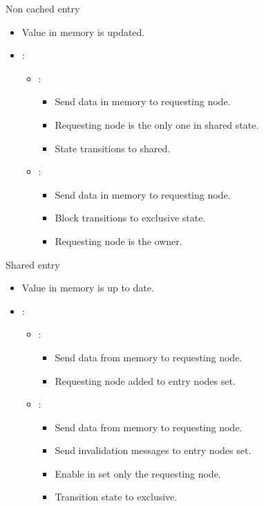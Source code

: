 \begin{frame}[t]{Non cached entry}
\begin{itemize}
  \item Value in memory is updated.

  \item {}:
    \begin{itemize}
      \item {}:
        \begin{itemize}
          \item Send data in memory to requesting node.
          \item Requesting node is the only one in shared state.
          \item State transitions to shared.
        \end{itemize}
      \item {}:
        \begin{itemize}
          \item Send data in memory to requesting node.
          \item Block transitions to exclusive state.
          \item Requesting node is the owner.
        \end{itemize}
    \end{itemize}
\end{itemize}
\end{frame}

\begin{frame}[t]{Shared entry}
\begin{itemize}
  \item Value in memory is up to date.

  \item {}:
    \begin{itemize}

      \item {}:
        \begin{itemize}
          \item Send data from memory to requesting node.
          \item Requesting node added to entry nodes set.
        \end{itemize}

      \item {}:
        \begin{itemize}
          \item Send data from memory to requesting node.
          \item Send invalidation messages to entry nodes set.
          \item Enable in set only the requesting node.
          \item Transition state to exclusive.
        \end{itemize}
    \end{itemize}
\end{itemize}
\end{frame}

